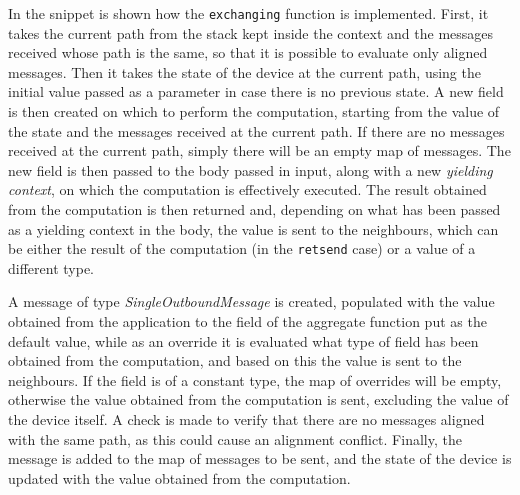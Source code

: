 In the  snippet is shown how the \texttt{exchanging} function is implemented.
First, it takes the current path from the stack kept inside the context and the messages received whose path is the same,
so that it is possible to evaluate only aligned messages.
Then it takes the state of the device at the current path, using the initial value passed as a parameter in case there is no previous state.
A new field is then created on which to perform the computation, starting from the value of the state and the messages received at the current path.
If there are no messages received at the current path, simply there will be an empty map of messages.
The new field is then passed to the body passed in input, along with a new \emph{yielding context}, on which the computation is effectively executed.
The result obtained from the computation is then returned and, depending on what has been passed as a yielding context in the body,
the value is sent to the neighbours, which can be either the result of the computation (in the \texttt{retsend} case) or a value of a different type.

A message of type \emph{SingleOutboundMessage} is created, populated with the value obtained from the application to the field
of the aggregate function put as the default value, while as an override it is evaluated what type of field has been
obtained from the computation, and based on this the value is sent to the neighbours.
If the field is of a constant type, the map of overrides will be empty, otherwise the value obtained from the computation
is sent, excluding the value of the device itself.
A check is made to verify that there are no messages aligned with the same path, as this could cause an alignment conflict.
Finally, the message is added to the map of messages to be sent, and the state of the device is updated with the value obtained from the computation.

